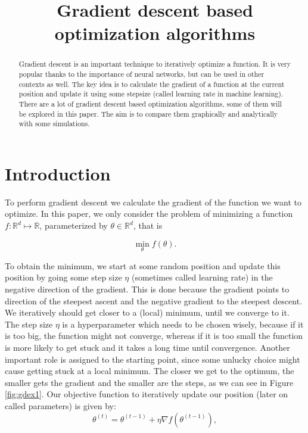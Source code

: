 \documentclass[aodsor,preprint]{imsart}
\numberwithin{equation}{section}
\theoremstyle{plain}
\begin{document}
\begin{frontmatter}
\title{Gradient descent based optimization algorithms}

\begin{aug}
\author{ }





\end{aug}

\begin{abstract}
Gradient descent is an important technique to iteratively optimize a function. It is very popular thanks to the importance of neural networks, but can be used in other contexts as well. The key idea is to calculate the gradient of a function at the current position and update it using some stepsize (called learning rate in machine learning). There are a lot of gradient descent based optimization algorithms, some of them will be explored in this paper. The aim is to compare them graphically and analytically with some simulations.
\end{abstract}


\end{frontmatter}

\section{Introduction}
To perform gradient descent we calculate the gradient of the function we want to optimize. In this paper, we only consider the problem of minimizing a function $f : \mathbb{R}^d \mapsto \mathbb{R}$, parameterized by $\theta \in \mathbb{R}^d$, that is

\begin{equation} \label{eq:objFunction}
\min_{\theta} f(\theta).
\end{equation}

To obtain the minimum, we start at some random position and update this position by going some step size $\eta$ (sometimes called learning rate) in the negative direction of the gradient. This is done because the gradient points to direction of the steepest ascent and the negative gradient to the steepest descent. We iteratively should get closer to a (local) minimum, until we converge to it. The step size $\eta$ is a hyperparameter which needs to be chosen wisely, because if it is too big, the function might not converge, whereas if it is too small the function is more likely to get stuck and it takes a long time until convergence. Another important role is assigned to the starting point, since some unlucky choice might cause getting stuck at a local minimum. The closer we get to the optimum, the smaller gets the gradient and the smaller are the steps, as we can see in Figure \ref{fig:gdex1}. Our objective function to iteratively update our position (later on called parameters) is given by:
\begin{equation} \label{eq:gd}
\theta^{(t)} = \theta^{(t-1)} + \eta \nabla f(\theta^{(t-1)}),
\end{equation}
\end{document}
